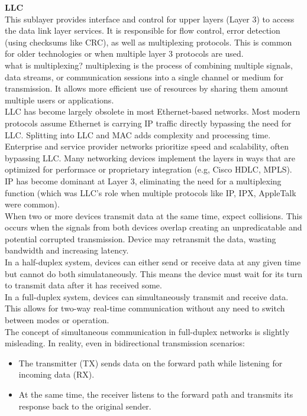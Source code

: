 \documentclass[parindent=0pt]{article}
\begin{document}
\textbf{LLC}\\
This sublayer provides interface and control for upper layers (Layer 3) to access the data link layer services. It is responsible for flow control, error detection (using checksums like CRC), as well as multiplexing protocols. This is common for older technologies or when multiple layer 3 protocols are used.\\
what is multiplexing? multiplexing is the process of combining multiple signals, data streams, or communication sessions into a single channel or medium for transmission. It allows more efficient use of resources by sharing them amount multiple users or applications.\\

LLC has become largely obsolete in most Ethernet-based networks. Most modern protocols assume Ethernet is carrying IP traffic directly bypassing the need for LLC. Splitting into LLC and MAC adds complexity and processing time. Enterprise and service provider networks prioritize speed and scalability, often bypassing LLC. Many networking devices implement the layers in ways that are optimized for performace or proprietary integration (e.g, Cisco HDLC, MPLS). IP has become dominant at Layer 3, eliminating the need for a multiplexing function (which was LLC's role when multiple protocols like IP, IPX, AppleTalk were common).\\

When two or more devices transmit data at the same time, expect collisions. This occurs when the signals from both devices overlap creating an unpredicatable and potential corrupted transmission. Device may retransmit the data, wasting bandwidth and increasing latency.\\ 

In a half-duplex system, devices can either send or receive data at any given time but cannot do both simulataneously. This means the device must wait for its turn to transmit data after it has received some.\\

In a full-duplex system, devices can simultaneously transmit and receive data. This allows for two-way real-time communication without any need to switch between modes or operation.\\

The concept of simultaneous communication in full-duplex networks is slightly misleading. In reality, even in bidirectional transmission scenarios:
	\begin{itemize}
		\item The transmitter (TX) sends data on the forward path while listening for incoming data (RX).
		\item At the same time, the receiver listens to the forward path and transmits its response back to the original sender.
	\end{itemize}
\end{document}
